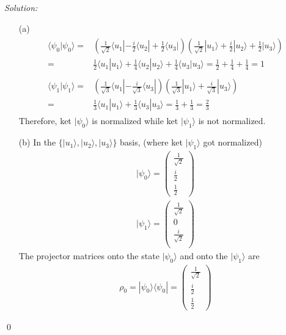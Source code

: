 \documentclass[12pt,a4paper]{article}
\newenvironment{sol}
    {\emph{Solution:}
    }
    {
    \qed
    }
\begin{document}
\begin{sol}
\begin{itemize}
\item[(a)]
\begin{gather}
\begin{align}
\nonumber\langle\psi_0|\psi_0\rangle=&(\frac{1}{\sqrt{2}}\langle u_1|-\frac{i}{2}\langle u_2|+\frac{1}{2}\langle u_3|)(\frac{1}{\sqrt{2}}|u_1\rangle+\frac{i}{2}|u_2\rangle+\frac{1}{2}|u_3\rangle)\\
=&\frac{1}{2}\langle u_1|u_1\rangle+\frac{1}{4}\langle u_2|u_2\rangle+\frac{1}{4}\langle u_3|u_3\rangle=\frac{1}{2}+\frac{1}{4}+\frac{1}{4}=1
\end{align}\\
\begin{align}
\nonumber\langle\psi_1|\psi_1\rangle=&(\frac{1}{\sqrt{3}}\langle u_1|-\frac{i}{\sqrt{3}}\langle u_3|)(\frac{1}{\sqrt{3}}|u_1\rangle+\frac{i}{\sqrt{3}}|u_3\rangle)\\
=&\frac{1}{3}\langle u_1|u_1\rangle+\frac{1}{3}\langle u_3|u_3\rangle=\frac{1}{3}+\frac{1}{3}=\frac{2}{3}
\end{align}
\end{gather}
Therefore, ket $|\psi_0\rangle$ is normalized while ket $|\psi_1\rangle$ is not normalized.
\item[(b)] In the $\{|u_1\rangle,|u_2\rangle,|u_3\rangle\}$ basis, (where ket $|\psi_1\rangle$ got normalized)
\begin{gather}
|\psi_0\rangle=
\left(\begin{array}{c}
\frac{1}{\sqrt{2}}\\
\frac{i}{2}\\
\frac{1}{2}
\end{array}\right)\\
|\psi_1\rangle=
\left(\begin{array}{c}
\frac{1}{\sqrt{2}}\\
0\\
\frac{i}{\sqrt{2}}\\
\end{array}\right)
\end{gather}
The projector matrices onto the state $|\psi_0\rangle$ and onto the $|\psi_1\rangle$ are
\begin{gather}
\rho_0=|\psi_0\rangle\langle\psi_0|=
\left(\begin{array}{c}
\frac{1}{\sqrt{2}}\\
\frac{i}{2}\\
\frac{1}{2}
\end{array}\right)

\end{gather}
\end{itemize}
\end{sol}
\end{document}
